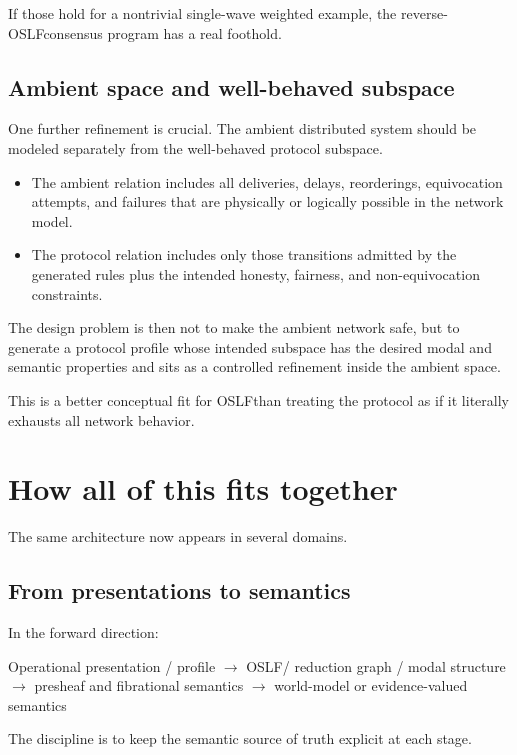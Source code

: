 \documentclass[11pt]{article}
\newcommand{\OSLF}{OSLF}
\begin{document}
If those hold for a nontrivial single-wave weighted example, the reverse-\OSLF consensus program has a real foothold.

\subsection{Ambient space and well-behaved subspace}

One further refinement is crucial. The ambient distributed system should be modeled separately from the well-behaved protocol subspace.

\begin{itemize}
  \item The ambient relation includes all deliveries, delays, reorderings, equivocation attempts, and failures that are physically or logically possible in the network model.
  \item The protocol relation includes only those transitions admitted by the generated rules plus the intended honesty, fairness, and non-equivocation constraints.
\end{itemize}

The design problem is then not to make the ambient network safe, but to generate a protocol profile whose intended subspace has the desired modal and semantic properties and sits as a controlled refinement inside the ambient space.

This is a better conceptual fit for \OSLF than treating the protocol as if it literally exhausts all network behavior.

\section{How all of this fits together}

The same architecture now appears in several domains.

\subsection{From presentations to semantics}

In the forward direction:

\begin{center}
Operational presentation / profile
$\longrightarrow$
\OSLF / reduction graph / modal structure
$\longrightarrow$
presheaf and fibrational semantics
$\longrightarrow$
world-model or evidence-valued semantics
\end{center}

The discipline is to keep the semantic source of truth explicit at each stage.
\end{document}
